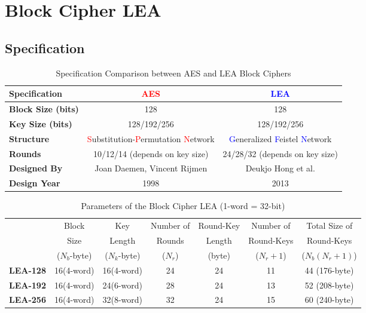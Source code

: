 \chapter{Block Cipher LEA}
\section{Specification}

\begin{table}[h]
	\centering
	\caption{Specification Comparison between AES and LEA Block Ciphers}
	\begin{tabular*}{\textwidth}{@{\extracolsep{\fill}}>{\bfseries}lcc}
		\toprule
		Specification & \textcolor{red}{\bf AES} & \textcolor{blue}{\bf LEA} \\
		\midrule
		Block Size (bits) & 128 & 128 \\
		Key Size (bits) & 128/192/256 & 128/192/256 \\
		Structure & \textcolor{red}{S}ubstitution-\textcolor{red}{P}ermutation \textcolor{red}{N}etwork & \textcolor{blue}{G}eneralized \textcolor{blue}{F}eistel \textcolor{blue}{N}etwork \\
		Rounds & 10/12/14 (depends on key size) & 24/28/32 (depends on key size) \\
		Designed By & Joan Daemen, Vincent Rijmen  & Deukjo Hong et al. \\
		Design Year & 1998 & 2013 \\
		\bottomrule
	\end{tabular*}
\end{table}

\begin{table}[h!]\centering\renewcommand{\arraystretch}{1.25} %
	\caption{Parameters of the Block Cipher LEA (1-word = 32-bit)}
	\begin{tabular*}{\textwidth}{@{\extracolsep{\fill}}>{\bfseries}c||cccccc}
		\toprule[1.2pt]
		\multirow{3}{*}{Algorithms} & Block & Key & Number of & Round-Key & Number of & Total Size of\\
		& Size & Length & Rounds &  Length & Round-Keys & Round-Keys \\
		& ($N_b$-byte) & ($N_k$-byte) & ($N_r$)& (byte) & ($N_r+1$)& ($N_b(N_r+1)$)\\
		\hline\hline
		LEA-128 & 16(4-word) & 16(4-word) & 24 & 24 & 11 & 44 (176-byte) \\
		LEA-192 & 16(4-word) & 24(6-word) & 28 & 24 & 13 & 52 (208-byte) \\
		LEA-256 & 16(4-word) & 32(8-word) & 32 & 24 & 15 & 60 (240-byte) \\
		\bottomrule[1.2pt]
	\end{tabular*}
\end{table}

